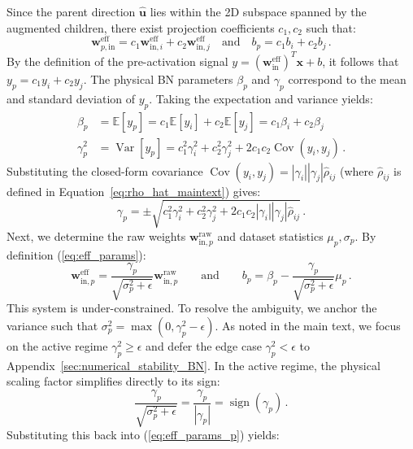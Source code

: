 \documentclass[11pt, a4paper, copyright, gdm]{google}
\newcommand{\uVect}{\boldsymbol{u}}
\newcommand{\wVect}{\boldsymbol{w}}
\newcommand{\xVect}{\boldsymbol{x}}
\newcommand{\E}{\mathbb{E}}
\DeclareMathOperator{\Var}{Var}
\DeclareMathOperator{\Cov}{Cov}
\DeclareMathOperator{\sign}{sign}
\theoremstyle{definition}
\begin{document}
Since the parent direction $\widehat{\uVect}$ lies within the 2D subspace spanned by the augmented children, there exist projection coefficients $c_1, c_2$ such that:
\begin{equation}
\wVect_{p, \text{in}}^{\text{eff}} = c_1 \wVect_{\text{in},i}^{\text{eff}} + c_2 \wVect_{\text{in},j}^{\text{eff}} \quad \text{and} \quad b_p = c_1 b_i + c_2 b_j \,.
\end{equation}
By the definition of the pre-activation signal $y = (\wVect_{\text{in}}^{\text{eff}})^T \xVect + b$, it follows that $y_p = c_1 y_i + c_2 y_j$. The physical BN parameters $\beta_p$ and $\gamma_p$ correspond to the mean and standard deviation of $y_p$. Taking the expectation and variance yields:
\begin{align}
\beta_p &= \E[y_p] = c_1 \E[y_i] + c_2 \E[y_j] = c_1 \beta_i + c_2 \beta_j \\
\gamma_p^2 &= \Var[y_p] = c_1^2 \gamma_i^2 + c_2^2 \gamma_j^2 + 2 c_1 c_2 \Cov(y_i,y_j) \,.
\end{align}
Substituting the closed-form covariance $\Cov(y_i , y_j) = |\gamma_i| |\gamma_j| \hat{\rho}_{ij}$ (where $\hat{\rho}_{ij}$ is defined in Equation~\ref{eq:rho_hat_maintext}) gives:
\begin{equation}
\label{eq:gamma_both_signs}
\gamma_p = \pm \sqrt{c_1^2 \gamma_i^2 + c_2^2 \gamma_j^2 + 2 c_1 c_2 |\gamma_i| |\gamma_j| \hat{\rho}_{ij}} \,.
\end{equation}
Next, we determine the raw weights $\wVect_{\text{in},p}^{\text{raw}}$ and dataset statistics $\mu_p, \sigma_p$. By definition (\ref{eq:eff_params}):
\begin{equation}
\label{eq:eff_params_p}
\wVect_{\text{in},p}^{\text{eff}} = \frac{\gamma_p}{\sqrt{\sigma_p^2 + \epsilon}} \wVect_{\text{in},p}^{\text{raw}} \qquad \text{and} \qquad b_p = \beta_p - \frac{\gamma_p}{\sqrt{\sigma_p^2 + \epsilon}} \mu_p \,.
\end{equation}
This system is under-constrained. To resolve the ambiguity, we anchor the variance such that $\sigma_p^2 = \max(0, \gamma_p^2 - \epsilon)$. As noted in the main text, we focus on the active regime $\gamma_p^2 \ge \epsilon$ and defer the edge case $\gamma_p^2 < \epsilon$ to Appendix~\ref{sec:numerical_stability_BN}. In the active regime, the physical scaling factor simplifies directly to its sign:
\begin{equation}
\frac{\gamma_p}{\sqrt{\sigma_p^2 + \epsilon}} = \frac{\gamma_p}{|\gamma_p|} = \sign(\gamma_p) \,.
\end{equation}
Substituting this back into (\ref{eq:eff_params_p}) yields:
\end{document}
